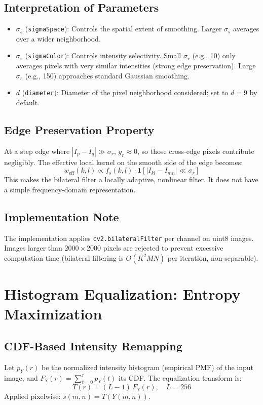 \documentclass[10pt,conference]{IEEEtran}
\begin{document}
\subsection{Interpretation of Parameters}
\begin{itemize}
\item $\sigma_s$ (\texttt{sigmaSpace}): Controls the spatial extent of smoothing. Larger $\sigma_s$ averages over a wider neighborhood.
\item $\sigma_r$ (\texttt{sigmaColor}): Controls intensity selectivity. Small $\sigma_r$ (e.g., 10) only averages pixels with very similar intensities (strong edge preservation). Large $\sigma_r$ (e.g., 150) approaches standard Gaussian smoothing.
\item $d$ (\texttt{diameter}): Diameter of the pixel neighborhood considered; set to $d = 9$ by default.
\end{itemize}

\subsection{Edge Preservation Property}
At a step edge where $|I_p - I_q| \gg \sigma_r$, $g_r \approx 0$, so those cross-edge pixels contribute negligibly. The effective local kernel on the smooth side of the edge becomes:
\begin{equation}
w_\text{eff}(k,l) \propto f_s(k,l) \cdot \mathbf{1}[|I_{kl}-I_{mn}| \ll \sigma_r]
\end{equation}
This makes the bilateral filter a locally adaptive, nonlinear filter. It does not have a simple frequency-domain representation.

\subsection{Implementation Note}
The implementation applies \texttt{cv2.bilateralFilter} per channel on uint8 images. Images larger than $2000 \times 2000$ pixels are rejected to prevent excessive computation time (bilateral filtering is $O(K^2 MN)$ per iteration, non-separable).

\section{Histogram Equalization: Entropy Maximization}

\subsection{CDF-Based Intensity Remapping}
Let $p_Y(r)$ be the normalized intensity histogram (empirical PMF) of the input image, and $F_Y(r) = \sum_{t=0}^{r} p_Y(t)$ its CDF. The equalization transform is:
\begin{equation}
T(r) = (L-1)\,F_Y(r), \quad L = 256
\end{equation}
Applied pixelwise: $s(m,n) = T(Y(m,n))$.
\end{document}
